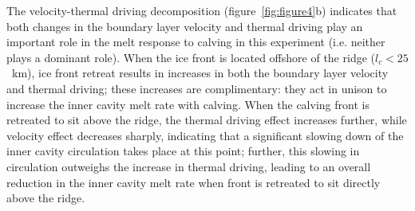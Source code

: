\documentclass[draft]{agujournal2019}
\begin{document}
The velocity-thermal driving decomposition (figure~\ref{fig:figure4}b) indicates that both changes in the boundary layer velocity and thermal driving play an important role in the melt response to calving in this experiment (i.e. neither plays a dominant role).  When the ice front is located offshore of the ridge ($l_c < 25$~km), ice front retreat results in increases in both the boundary layer velocity and thermal driving; these increases are complimentary: they act in unison to increase the inner cavity melt rate with calving. When the calving front is retreated to sit above the ridge, the thermal driving effect increases further, while velocity effect decreases sharply, indicating that a significant slowing down of the inner cavity circulation takes place at this point; further, this slowing in circulation outweighs the increase in thermal driving, leading to an overall reduction in the inner cavity melt rate when front is retreated to sit directly above the ridge. 
\end{document}
